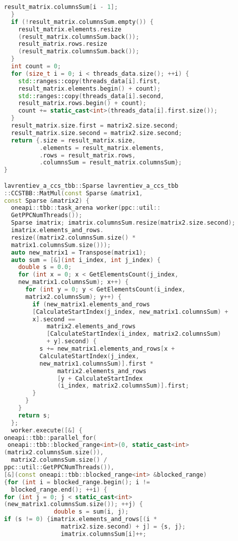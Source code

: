\documentclass[12pt]{article}
\begin{document}
\begin{lstlisting}[language=C++]
    result_matrix.columnsSum[i - 1];
  }
  if (!result_matrix.columnsSum.empty()) {
    result_matrix.elements.resize
    (result_matrix.columnsSum.back());
    result_matrix.rows.resize
    (result_matrix.columnsSum.back());
  }
  int count = 0;
  for (size_t i = 0; i < threads_data.size(); ++i) {
    std::ranges::copy(threads_data[i].first, 
    result_matrix.elements.begin() + count);
    std::ranges::copy(threads_data[i].second,
    result_matrix.rows.begin() + count);
    count += static_cast<int>(threads_data[i].first.size());
  }
  result_matrix.size.first = matrix2.size.second;
  result_matrix.size.second = matrix2.size.second;
  return {.size = result_matrix.size,
          .elements = result_matrix.elements,
          .rows = result_matrix.rows,
          .columnsSum = result_matrix.columnsSum};
}

lavrentiev_a_ccs_tbb::Sparse lavrentiev_a_ccs_tbb
::CCSTBB::MatMul(const Sparse &matrix1, 
const Sparse &matrix2) {
  oneapi::tbb::task_arena worker(ppc::util::
  GetPPCNumThreads());
  Sparse imatrix; imatrix.columnsSum.resize(matrix2.size.second);
  imatrix.elements_and_rows.
  resize((matrix2.columnsSum.size() * 
  matrix1.columnsSum.size()));
  auto new_matrix1 = Transpose(matrix1);
  auto sum = [&](int i_index, int j_index) {
    double s = 0.0;
    for (int x = 0; x < GetElementsCount(j_index, 
    new_matrix1.columnsSum); x++) {
      for (int y = 0; y < GetElementsCount(i_index, 
      matrix2.columnsSum); y++) {
        if (new_matrix1.elements_and_rows
        [CalculateStartIndex(j_index, new_matrix1.columnsSum) + 
        x].second ==
            matrix2.elements_and_rows
            [CalculateStartIndex(i_index, matrix2.columnsSum)
            + y].second) {
          s += new_matrix1.elements_and_rows[x + 
          CalculateStartIndex(j_index, 
          new_matrix1.columnsSum)].first *
               matrix2.elements_and_rows
               [y + CalculateStartIndex
               (i_index, matrix2.columnsSum)].first;
        }
      }
    }
    return s;
  };
  worker.execute([&] {
oneapi::tbb::parallel_for(
 oneapi::tbb::blocked_range<int>(0, static_cast<int>
(matrix2.columnsSum.size()),
  matrix2.columnsSum.size() / 
ppc::util::GetPPCNumThreads()),
[&](const oneapi::tbb::blocked_range<int> &blocked_range)
{for (int i = blocked_range.begin(); i != 
  blocked_range.end(); ++i) {
for (int j = 0; j < static_cast<int>
(new_matrix1.columnsSum.size()); ++j) {
              double s = sum(i, j);
if (s != 0) {imatrix.elements_and_rows[(i * 
                matrix2.size.second) + j] = {s, j};
                imatrix.columnsSum[i]++;

\end{lstlisting}
\end{document}
